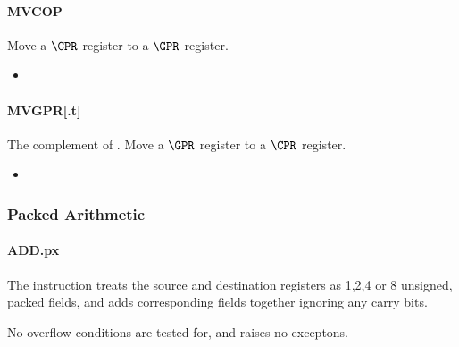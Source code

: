 \paragraph{MVCOP}

Move a $\CPR$ register to a $\GPR$ register.

\begin{itemize}
\item {}
\end{itemize}


\paragraph{MVGPR[.t]}

The complement of .
Move a $\GPR$ register to a $\CPR$ register.

\begin{itemize}
\item {}
\end{itemize}

\subsubsection{Packed Arithmetic}
\paragraph{ADD.px}

The instruction  treats the source and destination registers as
1,2,4 or 8 unsigned, packed fields, and adds corresponding fields together
ignoring any carry bits.

No overflow conditions are tested for, and  raises no exceptons.

